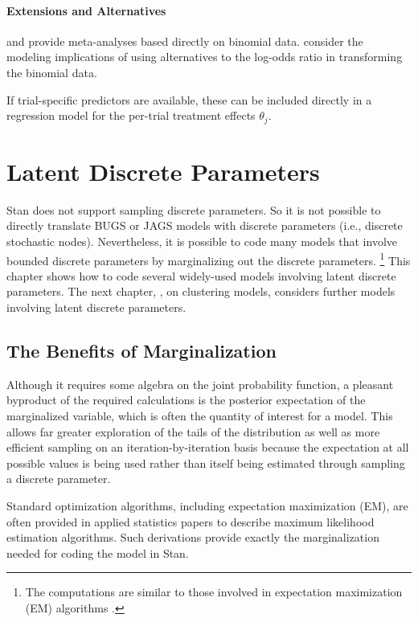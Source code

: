 \subsubsection{Extensions and Alternatives}

\citet{SmithSpiegelhalterThomas:1995} and
\citet[Section~19.4]{GelmanEtAl:2013} provide
meta-analyses based directly on binomial data.
\citet{WarnThompsonSpiegelhalter:2002} consider the modeling
implications of using alternatives to the log-odds ratio in
transforming the binomial data.

If trial-specific predictors are available, these can be included
directly in a regression model for the per-trial treatment effects
$\theta_j$.


\chapter{Latent Discrete Parameters}\label{latent-discrete.chapter}

\noindent
Stan does not support sampling discrete parameters.  So it is not
possible to directly translate BUGS or JAGS models with discrete
parameters (i.e., discrete stochastic nodes).  Nevertheless, it is
possible to code many models that involve bounded discrete
parameters by marginalizing out the discrete parameters.%
%
\footnote{The computations are similar to those involved in
  expectation maximization (EM) algorithms
  \citep{dempster-et-al:1977}.}
%
This chapter shows how to code several widely-used models involving
latent discrete parameters.  The next chapter,
, on clustering models, considers further
models involving latent discrete parameters.

\section{The Benefits of Marginalization}\label{rao-blackwell.section}

Although it requires some algebra on the joint probability function,
a pleasant byproduct of the required calculations is the posterior
expectation of the marginalized variable, which is often the quantity
of interest for a model.  This allows far greater exploration of the
tails of the distribution as well as more efficient sampling on an
iteration-by-iteration basis because the expectation at all possible
values is being used rather than itself being estimated through
sampling a discrete parameter.

Standard optimization algorithms, including expectation maximization
(EM), are often provided in applied statistics papers to describe
maximum likelihood estimation algorithms.  Such derivations provide
exactly the marginalization needed for coding the model in Stan.
 
